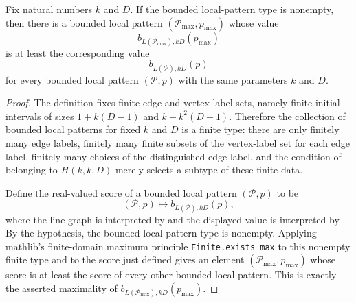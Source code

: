\begin{helper}
Fix natural numbers $k$ and $D$.  If the bounded local-pattern type
 is nonempty, then there is a
bounded local pattern $(\mathcal P_{\max},p_{\max})$ whose value
\[
b_{L(\mathcal P_{\max}),kD}(p_{\max})
\]
is at least the corresponding value
\[
b_{L(\mathcal P),kD}(p)
\]
for every bounded local pattern $(\mathcal P,p)$ with the same parameters
$k$ and $D$.
\end{helper}
\begin{proof}
The definition  fixes finite
edge and vertex label sets, namely finite initial intervals of sizes
$1+k(D-1)$ and $k+k^2(D-1)$.  Therefore the collection of bounded local
patterns for fixed $k$ and $D$ is a finite type: there are only finitely
many edge labels, finitely many finite subsets of the vertex-label set for
each edge label, finitely many choices of the distinguished edge label, and
the condition of belonging to $H(k,k,D)$ merely selects a subtype of these
finite data.

Define the real-valued score of a bounded local pattern $(\mathcal P,p)$ to
be
\[
(\mathcal P,p)\longmapsto b_{L(\mathcal P),kD}(p),
\]
where the line graph is interpreted by  and
the displayed value is interpreted by .  By the
hypothesis, the bounded local-pattern type is nonempty.  Applying
mathlib's finite-domain maximum principle \texttt{Finite.exists\_max} to this nonempty finite type and
to the score just defined gives an element
$(\mathcal P_{\max},p_{\max})$ whose score is at least the score of every
other bounded local pattern.  This is exactly the asserted maximality of
$b_{L(\mathcal P_{\max}),kD}(p_{\max})$.
\end{proof}
